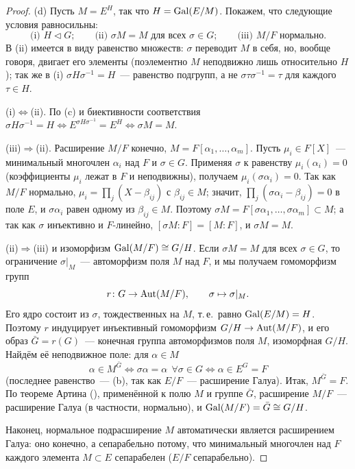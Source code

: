 \begin{proof}
(d) Пусть $M=E^H$, так что $H=\operatorname{Gal}(E/M)$. Покажем, что следующие условия равносильны:
\[
\text{(i) } H\triangleleft G;\qquad\text{(ii) } \sigma M=M\text{ для всех }\sigma\in G;\qquad\text{(iii) } M/F\text{ нормально.}
\]
В (ii) имеется в виду равенство множеств: $\sigma$ переводит $M$ в себя, но, вообще говоря, двигает его элементы
(поэлементно $M$ неподвижно лишь относительно $H$); так же в (i) $\sigma H\sigma^{-1}=H$~--- равенство подгрупп, а не
$\sigma\tau\sigma^{-1}=\tau$ для каждого $\tau\in H$.

(i)$\Leftrightarrow$(ii). По (c) и биективности соответствия $\sigma H\sigma^{-1}=H\iff E^{\sigma H\sigma^{-1}}=E^H\iff\sigma M=M$.

(iii)$\Rightarrow$(ii). Расширение $M/F$ конечно, $M=F[\alpha_1,\dots,\alpha_m]$. Пусть $\mu_i\in F[X]$~--- минимальный
многочлен $\alpha_i$ над $F$ и $\sigma\in G$. Применяя $\sigma$ к равенству $\mu_i(\alpha_i)=0$ (коэффициенты $\mu_i$ лежат
в $F$ и неподвижны), получаем $\mu_i(\sigma\alpha_i)=0$. Так как $M/F$ нормально, $\mu_i=\prod_j(X-\beta_{ij})$ с
$\beta_{ij}\in M$; значит, $\prod_j(\sigma\alpha_i-\beta_{ij})=0$ в поле $E$, и $\sigma\alpha_i$ равен одному из
$\beta_{ij}\in M$. Поэтому $\sigma M=F[\sigma\alpha_1,\dots,\sigma\alpha_m]\subset M$; а так как $\sigma$ инъективно и
$F$-линейно, $[\sigma M:F]=[M:F]$, и $\sigma M=M$.

(ii)$\Rightarrow$(iii) и изоморфизм $\operatorname{Gal}(M/F)\cong G/H$. Если $\sigma M=M$ для всех $\sigma\in G$, то ограничение
$\sigma|_M$~--- автоморфизм поля $M$ над $F$, и мы получаем гомоморфизм групп
\[
r\colon G\to\operatorname{Aut}(M/F),\qquad \sigma\mapsto\sigma|_M .
\]
Его ядро состоит из $\sigma$, тождественных на $M$, т.\,е.\ равно $\operatorname{Gal}(E/M)=H$. Поэтому $r$ индуцирует инъективный
гомоморфизм $G/H\to\operatorname{Aut}(M/F)$, и его образ $\bar G=r(G)$~--- конечная группа автоморфизмов поля $M$, изоморфная $G/H$.
Найдём её неподвижное поле: для $\alpha\in M$
\[
\alpha\in M^{\bar G}\iff\sigma\alpha=\alpha\ \ \forall\sigma\in G\iff\alpha\in E^G=F
\]
(последнее равенство~--- (b), так как $E/F$~--- расширение Галуа). Итак, $M^{\bar G}=F$. По теореме Артина
(), применённой к полю $M$ и группе $\bar G$, расширение $M/F$~--- расширение Галуа (в частности, нормально), и
$\operatorname{Gal}(M/F)=\bar G\cong G/H$.

Наконец, нормальное подрасширение $M$ автоматически является расширением Галуа: оно конечно, а сепарабельно потому,
что минимальный многочлен над $F$ каждого элемента $M\subset E$ сепарабелен ($E/F$ сепарабельно).
\end{proof}

